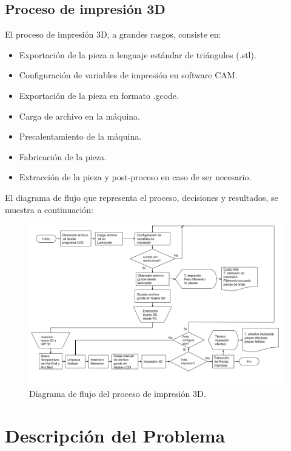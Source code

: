 \subsection{Proceso de impresión 3D}

El proceso de impresión 3D, a grandes rasgos, consiste en:

\begin{itemize}
\item Exportación de la pieza a lenguaje estándar de triángulos (.stl).
\item Configuración de variables de impresión en software CAM.
\item Exportación de la pieza en formato .gcode.
\item Carga de archivo en la máquina.
\item Precalentamiento de la máquina.
\item Fabricación de la pieza.
\item Extracción de la pieza y post-proceso en caso de ser necesario.
\end{itemize}

El diagrama de flujo que representa el proceso, decisiones y resultados, se muestra a continuación:

\begin{figure}[H]
\centering
\includegraphics[scale=0.4]{images/proceso.png}
\caption{Diagrama de flujo del proceso de impresión 3D.}
\end{figure}


\section{Descripción del Problema}

